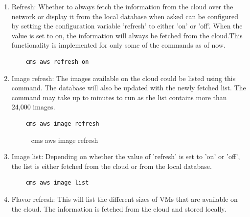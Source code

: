 \documentclass[9pt,twocolumn,twoside]{../../styles/osajnl}
\begin{document}
\begin{enumerate}
	
	\item Refresh: Whether to always fetch the information from the cloud over the network or display it from the local database when asked can be configured by setting the configuration variable 'refresh' to either 'on' or 'off'. When the value is set to on, the information will always be fetched from the cloud.This functionality is implemented for only some of the commands as of now.
	
	\begin{verbatim}
    cms aws refresh on
	\end{verbatim}
	
	\item Image refresh: The images available on the cloud could be listed using this command. The database will also be updated with the newly fetched list. The command may take up to minutes to run as the list contains more than 24,000 images.
	
	\begin{verbatim}
    cms aws image refresh
	\end{verbatim}
	
	\begin{figure}[h!]
		\centering
		\caption{cms aws image refresh}
		\label{fig:imagerefresh}
	\end{figure}
		
	\item Image list: Depending on whether the value of 'refresh' is set to 'on' or 'off', the list is either fetched from the cloud or from the local database.
	
	\begin{verbatim}
    cms aws image list
	\end{verbatim}
	
	\item Flavor refresh: This will list the different sizes of VMs that are available on the cloud. The information is fetched from the cloud and stored locally.
	

\end{enumerate}
\end{document}
